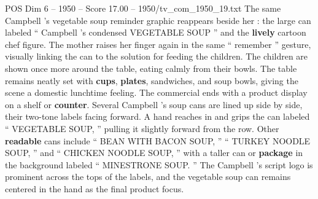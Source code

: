 \begin{textsample}{POS Dim 6 – 1950 – Score 17.00 – 1950/tv\_com\_1950\_19.txt}
The same Campbell ’s vegetable soup reminder graphic reappears beside her : the large can labeled “ Campbell ’s condensed VEGETABLE SOUP ” and the \textbf{lively} cartoon chef figure.
The mother raises her finger again in the same “ remember ” gesture, visually linking the can to the solution for feeding the children.
The children are shown once more around the table, eating calmly from their bowls.
The table remains neatly set with \textbf{cups}, \textbf{plates}, sandwiches, and soup bowls, giving the scene a domestic lunchtime feeling.
The commercial ends with a product display on a shelf or \textbf{counter}.
Several Campbell ’s soup cans are lined up side by side, their two-tone labels facing forward.
A hand reaches in and grips the can labeled “ VEGETABLE SOUP, ” pulling it slightly forward from the row.
Other \textbf{readable} cans include “ BEAN WITH BACON SOUP, ” “ TURKEY NOODLE SOUP, ” and “ CHICKEN NOODLE SOUP, ” with a taller can or \textbf{package} in the background labeled “ MINESTRONE SOUP. ” The Campbell ’s script logo is prominent across the tops of the labels, and the vegetable soup can remains centered in the hand as the final product focus.

\end{textsample}
